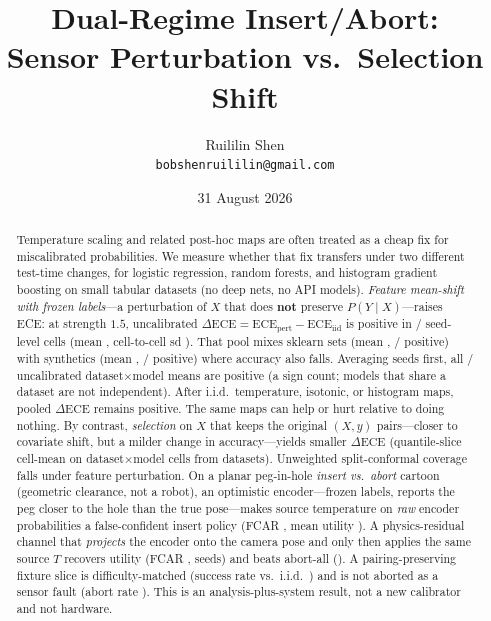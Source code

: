 \documentclass[10pt,twocolumn]{article}
\title{Dual-Regime Insert/Abort:\\
Sensor Perturbation vs.\ Selection Shift}
\author{Ruililin Shen\\
\texttt{bobshenruililin@gmail.com}}
\date{31 August 2026}
\begin{document}
\maketitle
\begin{abstract}
Temperature scaling and related post-hoc maps are often treated as a cheap
fix for miscalibrated probabilities. We measure whether that fix
transfers under two different test-time changes, for logistic regression,
random forests, and histogram gradient boosting on small tabular datasets
(no deep nets, no API models). \emph{Feature mean-shift with frozen
labels}---a perturbation of $X$ that does \textbf{not} preserve
$P(Y\mid X)$---raises ECE: at strength $1.5$, uncalibrated
$\Delta\mathrm{ECE}=\mathrm{ECE}_{\mathrm{pert}}-\mathrm{ECE}_{\mathrm{iid}}$
is positive in \NumNoneNPos/\NumNoneN{} seed-level cells (mean
\NumNoneDeltaMean, cell-to-cell sd \NumNoneDeltaStd). That pool mixes
sklearn sets (mean \NumSklearnDeltaMean,
\NumSklearnNPos/\NumSklearnN{} positive) with synthetics (mean
\NumSynthDeltaMean, \NumSynthNPos/\NumSynthN{} positive) where accuracy
also falls. Averaging seeds first, all
\NumTwelveMeanNPos/\NumTwelveMeanN{} uncalibrated
dataset$\times$model means are positive (a sign count; models that share
a dataset are not independent). After i.i.d.\ temperature, isotonic, or
histogram maps, pooled $\Delta\mathrm{ECE}$ remains positive. The same
maps can help or hurt relative to doing nothing. By contrast,
\emph{selection} on $X$ that keeps the original $(X,y)$ pairs---closer
to covariate shift, but a milder change in accuracy---yields smaller
$\Delta\mathrm{ECE}$ (quantile-slice cell-mean
\NumQuantileSliceDeltaMean{} on \NumExpFiveN{} dataset$\times$model cells
from \NumExpFiveNDs{} datasets). Unweighted split-conformal coverage
falls under feature perturbation. On a planar peg-in-hole
\emph{insert vs.\ abort} cartoon (geometric clearance, not a robot), an
optimistic encoder---frozen labels, reports the peg closer to the hole
than the true pose---makes source temperature on \emph{raw} encoder
probabilities a false-confident insert policy (FCAR
\NumPertIllegalFcr, mean utility \NumPertIllegalUtil). A physics-residual
channel that \emph{projects} the encoder onto the camera pose and only
then applies the same source $T$ recovers utility \NumPertRouterUtil{}
(FCAR \NumPertRouterFcr, \NumDualNSeeds{} seeds) and beats abort-all
(\NumPertAbortUtil). A pairing-preserving fixture slice is
difficulty-matched (success rate \NumDualPosSel{} vs.\ i.i.d.\
\NumDualPosIid) and is not aborted as a sensor fault (abort rate
\NumSelRouterAbort). This is an analysis-plus-system result, not a new
calibrator and not hardware.
\end{abstract}
\end{document}
